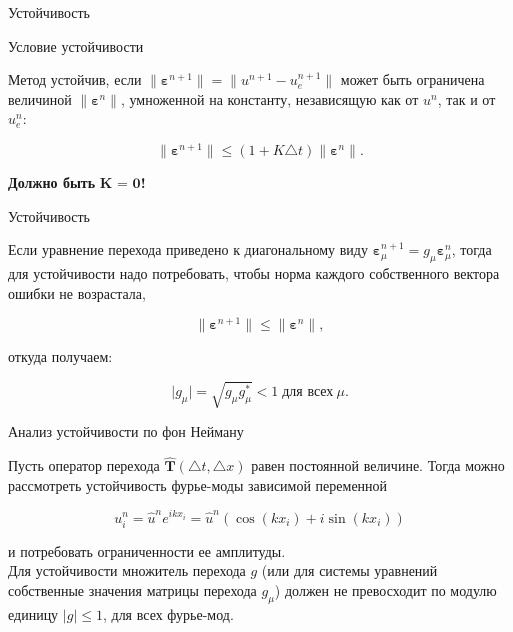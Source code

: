 \documentclass[10pt,xcolor=pst,aspectratio=169]{beamer}
\begin{document}
\begin{frame}{Устойчивость}

    \transdissolve[duration=0.1]
    \justifying
    \large

    \begin{block}{Условие устойчивости}

        Метод устойчив, если $\parallel \bm{\varepsilon}^{n + 1} \parallel = \parallel u^{n + 1} - u^{n + 1}_{e} \parallel$ может быть ограничена величиной $\parallel \bm{\varepsilon}^{n} \parallel$, умноженной на константу, независящую как от $u^{n}$, так и от $ u^{n}_{e}$:

        \[
            \parallel \bm{\varepsilon}^{n + 1} \parallel \leq \left( 1 + K \triangle t \right) \parallel \bm{\varepsilon}^{n} \parallel.
        \]

    \end{block}

    \begin{center}
        \textbf{Должно быть} $\textbf{K = 0}$\textbf{!}
    \end{center}

\end{frame}

\begin{frame}{Устойчивость}

    \transdissolve[duration=0.1]
    \justifying
    \large

    Если уравнение перехода приведено к диагональному виду $\bm{\varepsilon}^{n + 1}_{\mu} = g_{\mu} \bm{\varepsilon}^{n}_{\mu}$, тогда для устойчивости надо потребовать, чтобы норма каждого собственного вектора ошибки не возрастала,

    \[
        \parallel \bm{\varepsilon}^{n + 1} \parallel \leq \parallel \bm{\varepsilon}^{n} \parallel ,
    \]
    
    откуда получаем:

    \[
        \vert g_{\mu} \vert = \sqrt{ g_{\mu}  g^{*}_{\mu}} < 1 \; \mbox{для всех} \: \mu.
    \]

\end{frame}

\begin{frame}{Анализ устойчивости по фон Нейману}

    \transdissolve[duration=0.1]
    \justifying
    \large

    Пусть оператор перехода $\hat{\textbf{T}} (\triangle t, \triangle x)$ равен постоянной величине. Тогда можно рассмотреть устойчивость фурье-моды зависимой переменной

    \[
        u^{n}_{i} = \hat{u}^{n} e^{i k x_{i}} = \hat{u}^{n} \left( \cos{ \left( k x_{i} \right) } + i \sin{ \left( k x_{i} \right) } \right)
    \]

    и потребовать ограниченности ее амплитуды. \\

    Для устойчивости множитель перехода $g$ (или для системы уравнений собственные значения матрицы перехода $g_{\mu}$) должен не превосходит по модулю единицу $\vert g \vert \leq 1$, для всех фурье-мод.\\

\end{frame}
\end{document}
